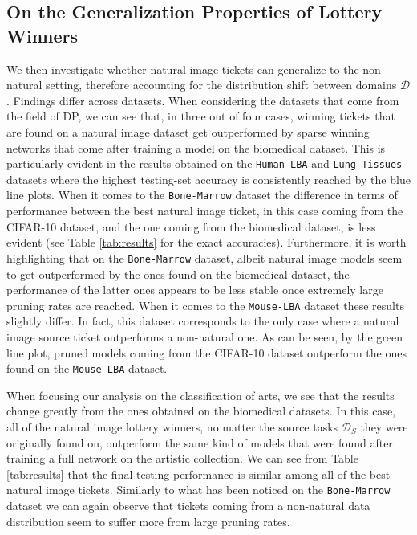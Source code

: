 




\subsection{On the Generalization Properties of Lottery Winners}
We then investigate whether natural image tickets can generalize to the non-natural setting, therefore accounting for the distribution shift between domains $\mathcal{D}$. Findings differ across datasets. When considering the datasets that come from the field of DP, we can see that, in three out of four cases, winning tickets that are found on a natural image dataset get outperformed by sparse winning networks that come after training a model on the biomedical dataset. This is particularly evident in the results obtained on the \texttt{Human-LBA} and \texttt{Lung-Tissues} datasets where the highest testing-set accuracy is consistently reached by the blue line plots. When it comes to the \texttt{Bone-Marrow} dataset the difference in terms of performance between the best natural image ticket, in this case coming from the CIFAR-10 dataset, and the one coming from the biomedical dataset, is less evident (see Table \ref{tab:results} for the exact accuracies). Furthermore, it is worth highlighting that on the \texttt{Bone-Marrow} dataset, albeit natural image models seem to get outperformed by the ones found on the biomedical dataset, the performance of the latter ones appears to be less stable once extremely large pruning rates are reached. When it comes to the \texttt{Mouse-LBA} dataset these results slightly differ. In fact, this dataset corresponds to the only case where a natural image source ticket outperforms a non-natural one. As can be seen, by the green line plot, pruned models coming from the CIFAR-10 dataset outperform the ones found on the \texttt{Mouse-LBA} dataset. 

When focusing our analysis on the classification of arts, we see that the results change greatly from the ones obtained on the biomedical datasets. In this case, all of the natural image lottery winners, no matter the source tasks $\mathcal{D}_S$ they were originally found on, outperform the same kind of models that were found after training a full network on the artistic collection. We can see from Table \ref{tab:results} that the final testing performance is similar among all of the best natural image tickets. Similarly to what has been noticed on the \texttt{Bone-Marrow} dataset we can again observe that tickets coming from a non-natural data distribution seem to suffer more from large pruning rates. 

